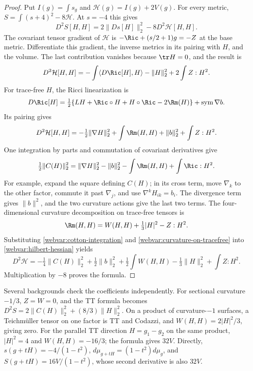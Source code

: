 \begin{proof}
Put $I(g)=\int s_g$ and $\mathcal H(g)=I(g)+2V(g)$.
For every metric,
$S=\int(s+4)^2-8\mathcal H$.  At $s=-4$ this gives
\[
 D^2S[H,H]=2\|Ds[H]\|_2^2-8D^2\mathcal H[H,H].
\]
The covariant tensor gradient of $\mathcal H$ is
$-\Ric+(s/2+1)g=-Z$ at the base metric.  Differentiate this gradient,
the inverse metrics in its pairing with $H$, and the volume.
The last contribution vanishes because $\tr H=0$, and the result is
\[
 D^2\mathcal H[H,H]
 =-\int\langle D\Ric[H],H\rangle-\|H\|_2^2+2\int Z:H^2.
\]
For trace-free $H$, the Ricci linearization is
\[
 D\Ric[H]=\tfrac12\{LH+\Ric\circ H+H\circ\Ric-2\Rm(H)\}
                 +\operatorname{sym}\nabla b .
\]
Its pairing gives
\begin{equation}\label{webvar:hilbert-hessian}
 D^2\mathcal H[H,H]
 =-\tfrac12\|\nabla H\|_2^2+\int\Rm(H,H)+\|b\|_2^2+\int Z:H^2.
\end{equation}
One integration by parts and commutation of covariant derivatives give
\begin{equation}\label{webvar:cotton-integration}
 \tfrac12\|C(H)\|_2^2
 =\|\nabla H\|_2^2-\|b\|_2^2-\int\Rm(H,H)+\int\Ric:H^2.
\end{equation}
For example, expand the square defining $C(H)$; in its cross term,
move $\nabla_k$ to the other factor, commute it past $\nabla_j$,
and use $\nabla^kH_{ik}=b_i$.  The divergence term gives $\|b\|^2$,
and the two curvature actions give the last two terms.
The four-dimensional curvature decomposition on trace-free tensors is
\begin{equation}\label{webvar:curvature-on-tracefree}
 \Rm(H,H)=W(H,H)+\tfrac13|H|^2-Z:H^2.
\end{equation}
Substituting \eqref{webvar:cotton-integration} and
\eqref{webvar:curvature-on-tracefree} into
\eqref{webvar:hilbert-hessian} yields
\[
 D^2\mathcal H
 =-\tfrac14\|C(H)\|_2^2+\tfrac12\|b\|_2^2
      +\tfrac12\int W(H,H)-\tfrac13\|H\|_2^2+\int Z:H^2.
\]
Multiplication by $-8$ proves the formula.
\end{proof}

Several backgrounds check the coefficients independently.  For sectional
curvature $-1/3$, $Z=W=0$, and the TT formula becomes
$D^2S=2\|C(H)\|_2^2+(8/3)\|H\|_2^2$.
On a product of curvature-$-1$ surfaces, a Teichm\"uller tensor on
one factor is TT and Codazzi, and $W(H,H)=2|H|^2/3$, giving zero.
For the parallel TT direction $H=g_1-g_2$ on the same product,
$|H|^2=4$ and $W(H,H)=-16/3$; the formula gives $32V$.
Directly,
$s(g+tH)=-4/(1-t^2)$, $d\mu_{g+tH}=(1-t^2)d\mu_g$, and
$S(g+tH)=16V/(1-t^2)$, whose second derivative is also $32V$.


